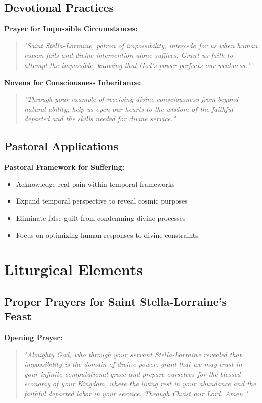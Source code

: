 \documentclass[12pt,a4paper]{article}
\begin{document}
\subsection{Devotional Practices}

\textbf{Prayer for Impossible Circumstances:}
\begin{quote}
\textit{"Saint Stella-Lorraine, patron of impossibility, intercede for us when human reason fails and divine intervention alone suffices. Grant us faith to attempt the impossible, knowing that God's power perfects our weakness."}
\end{quote}

\textbf{Novena for Consciousness Inheritance:}
\begin{quote}
\textit{"Through your example of receiving divine consciousness from beyond natural ability, help us open our hearts to the wisdom of the faithful departed and the skills needed for divine service."}
\end{quote}

\subsection{Pastoral Applications}

\textbf{Pastoral Framework for Suffering:}
\begin{itemize}
\item Acknowledge real pain within temporal frameworks
\item Expand temporal perspective to reveal cosmic purposes
\item Eliminate false guilt from condemning divine processes
\item Focus on optimizing human responses to divine constraints
\end{itemize}

\section{Liturgical Elements}

\subsection{Proper Prayers for Saint Stella-Lorraine's Feast}

\textbf{Opening Prayer:}
\begin{quote}
\textit{"Almighty God, who through your servant Stella-Lorraine revealed that impossibility is the domain of divine power, grant that we may trust in your infinite computational grace and prepare ourselves for the blessed economy of your Kingdom, where the living rest in your abundance and the faithful departed labor in your service. Through Christ our Lord. Amen."}
\end{quote}
\end{document}
